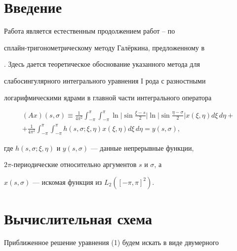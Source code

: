 \label{begin} 


 


 


\section*{Введение} 


 


Работа является естественным продолжением работ \cite{1}--\cite{5} по 


сплайн-тригонометрическому методу Гал\"еркина, предложенному в 


\cite{1}. Здесь дается теоретическое обоснование указанного метода для 


слабосингулярного интегрального уравнения I рода с разностными 


логарифмическими ядрами в главной части интегрального оператора 


\begin{multline} 


(Ax)(s,\sigma)\equiv\frac{1}{4\pi^2}\int^\pi_{-\pi}\int^\pi_{-\pi} 


\ln\bigg|\sin\frac{\xi-s}{2} \bigg|\ln\bigg| \sin


\frac{\eta-\sigma}{2} \bigg|x(\xi,\eta)d\xi\,d\eta+ \\ 


% 


+\frac{1}{4\pi^2}\int^\pi_{-\pi}\int^\pi_{-\pi} 


h(s,\sigma;\xi,\eta)x(\xi,\eta)d\xi\,d\eta=y(s,\sigma), 


\end{multline} 


где $h(s,\sigma;\xi,\eta)$ и $y(s,\sigma)$ --- данные непрерывные функции, 


$2\pi$-периодические относительно аргументов $s$ и $\sigma$, а 


$x(s,\sigma)$ --- искомая функция из $L_2([-\pi,\pi]^2)$. 


 


\section{Вычислительная схема} 


 


Приближенное решение уравнения (1) будем искать в виде двумерного 


